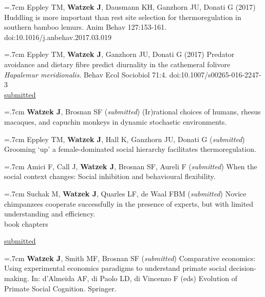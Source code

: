 \documentclass[]{friggeri-cv}
\begin{document}
\hangindent=.7cm Eppley TM, \textbf{Watzek J}, Dausmann KH, Ganzhorn JU, Donati G (2017) Huddling is more important than rest site selection for thermoregulation in southern bamboo lemurs. Anim Behav 127:153-161. doi:10.1016/j.anbehav.2017.03.019

\hangindent=.7cm Eppley TM, \textbf{Watzek J}, Ganzhorn JU, Donati G (2017) Predator avoidance and dietary fibre predict diurnality in the cathemeral folivore \emph{Hapalemur meridionalis}. Behav Ecol Sociobiol 71:4. doi:10.1007/s00265-016-2247-3 \\[.5cm]


\hspace{.35cm} { \underline{submitted}}

\hangindent=.7cm \textbf{Watzek J}, Brosnan SF (\emph{submitted}) (Ir)rational choices of humans, rhesus macaques, and capuchin monkeys in dynamic stochastic environments.

\hangindent=.7cm Eppley TM, \textbf{Watzek J}, Hall K, Ganzhorn JU, Donati G (\emph{submitted}) Grooming `up' a female-dominated social hierarchy facilitates thermoregulation.

\hangindent=.7cm Amici F, Call J, \textbf{Watzek J}, Brosnan SF, Aureli F (\emph{submitted}) When the social context changes: Social inhibition and behavioural flexibility.

\hangindent=.7cm Suchak M, \textbf{Watzek J}, Quarles LF, de Waal FBM (\emph{submitted}) Novice chimpanzees cooperate successfully in the presence of experts, but with limited understanding and efficiency. \\[.5cm]





{\subfont\large{} book chapters}


\hspace{.35cm} { \underline{submitted}}

\hangindent=.7cm \textbf{Watzek J}, Smith MF, Brosnan SF (\emph{submitted}) Comparative economics: Using experimental economics paradigms to understand primate social decision-making. In: d'Almeida AF, di Paolo LD, di Vincenzo F (eds) Evolution of Primate Social Cognition. Springer.
\end{document}
